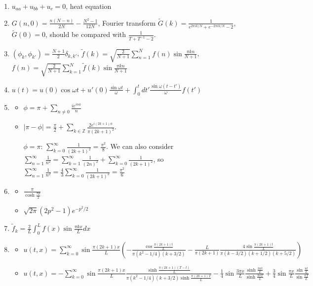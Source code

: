 \documentclass[a4paper,11pt]{article}
\begin{document}
\begin{enumerate}
\item\label{item:34} \(u_{aa}+u_{bb}+u_c=0\), heat equation

\item\label{item:35} \(G(n,0)=\frac{n(N-n)}{2N}-\frac{N^2-1}{12N}\), Fourier transform \(\tilde{G}(k)=\frac1{e^{2\pi ik/N}+e^{-2\pi i k/N}-2}\), \(\tilde{G}(0)=0\), should be compared with \(\frac1{T+T^{-1}-2}\).

\item\label{item:36} \((\phi_k,\phi_{k'})=\frac{N+1}{2}\delta_{k,k'}\), \(\tilde{f}(k)=\sqrt{\frac{2}{N+1}}\sum_{n=1}^N f(n)\sin \frac{\pi k n}{N+1}\), \(f(n)=\sqrt{\frac{2}{N+1}}\sum_{k=1}^N \tilde{f}(k)\sin \frac{\pi k n}{N+1}\)

\item\label{item:37} \(u(t)=u(0)\cos\omega t+u'(0)\frac{\sin\omega t}{\omega}+\int_0^t dt' \frac{\sin \omega(t-t')}{\omega}f(t')\)

\item\label{item:38} 
\begin{itemize}
\item \(\phi=\pi+\sum_{n\neq 0}\frac{i e^{in\phi}}{n} \)
\item \(|\pi-\phi|=\frac{\pi}2+\sum_{k\in \mathbb{Z}}\frac{2e^{i(2k+1)\phi}}{\pi(2k+1)^2}\).

\(\phi=\pi\): \(\sum_{k=0}^{\infty}\frac1{(2k+1)^2}=\frac{\pi^2}{8}\).
We can also consider \(\sum_{n=1}^{\infty}\frac1{n^2}=\sum_{k=1}^{\infty}\frac1{(2n)^2}+\sum_{k=0}^{\infty}\frac1{(2k+1)^2}\), so \(\sum_{n=1}^{\infty}\frac1{n^2}=\frac{4}{3}\sum_{k=0}^{\infty}\frac1{(2k+1)^2}=\frac{\pi^2}{6}\)
\end{itemize}

\item\label{item:39}
\begin{itemize}
\item  \(\frac{\pi}{\cosh \frac{\pi p}{2}}\)
\item \(\sqrt{2\pi}(2p^2-1)e^{-p^2/2}\)
\end{itemize}

\item\label{item:40} \(\tilde{f}_k=\frac{2}{L}\int_0^L f(x) \sin \frac{\pi k x}{L} dx\)

\item\label{item:41} 

\begin{itemize}
\item \(u(t,x)=\sum_{k=0}^{\infty}\sin \frac{\pi(2k+1)x}{L} \left(- \frac{\cos \frac{\pi(2k+1)t}{L}}{\pi(k^2-1/4)(k+3/2)} - \frac{L}{\pi(2k+1)}\frac{4\sin\frac{\pi(2k+1)t}{L}}{\pi(k-3/2)(k+1/2)(k+5/2)} \right)\)
\item \(u(t,x)=-\sum_{k=0}^{\infty}\sin \frac{\pi(2k+1)x}{L} \frac{\sinh \frac{\pi(2k+1)(T-t)}{L}}{\pi(k^2-1/4)(k+3/2)\sinh \frac{\pi(2k+1)T}{L}}
- \frac1{4} \sin \frac{3\pi x}{L} \frac{\sinh \frac{3\pi t}{L}}{\sinh \frac{3\pi T}{L}}+ \frac{3}{4}\sin \frac{\pi x}{L} \frac{\sin \frac{\pi t}{L}}{\sin \frac{\pi T}{L}}\)
\end{itemize}


\end{enumerate}
\end{document}
